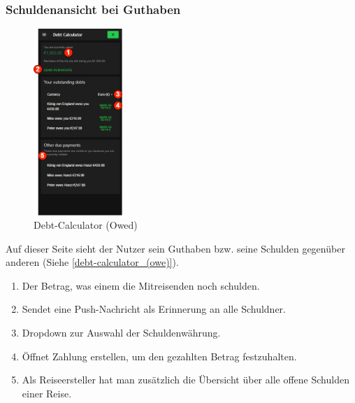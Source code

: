 \subsubsection{Schuldenansicht bei Guthaben}\label{debt-calculator_(owed)}
\begin{figure}[H]
	\centering
	\includegraphics[width=0.3\textwidth]{img/pages_numbers/debt-calculator_(owed).drawio}
	\caption[Debt-Calculator (Owed)]{Debt-Calculator (Owed)}
	\label{fig:debt-calculator_(owed)}
\end{figure}
Auf dieser Seite sieht der Nutzer sein Guthaben bzw. seine Schulden gegenüber anderen (Siehe \ref{debt-calculator_(owe)}).
\begin{enumerate}[label=\protect\circled{\arabic*}]
	\item Der Betrag, was einem die Mitreisenden noch schulden.
	\item Sendet eine Push-Nachricht als Erinnerung an alle Schuldner.
	\item Dropdown zur Auswahl der Schuldenwährung.
	\item Öffnet Zahlung erstellen, um den gezahlten Betrag festzuhalten.
	\item Als Reiseersteller hat man zusätzlich die Übersicht über alle offene Schulden einer Reise.
\end{enumerate}

